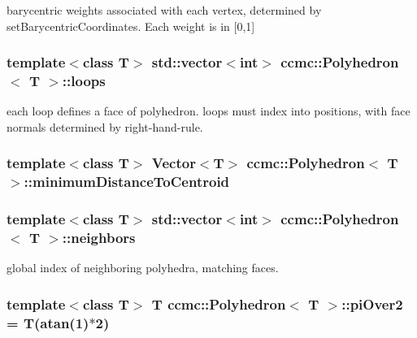 barycentric weights associated with each vertex, determined by set\-Barycentric\-Coordinates. Each weight is in \mbox{[}0,1\mbox{]} \hypertarget{classccmc_1_1_polyhedron_a275e8b1b13a16013da6bd125e203fd2c}{
\subsubsection[{loops}]{\setlength{\rightskip}{0pt plus 5cm}template$<$class T$>$ std\-::vector$<$int$>$ {\bf ccmc\-::\-Polyhedron}$<$ T $>$\-::loops}}\label{classccmc_1_1_polyhedron_a275e8b1b13a16013da6bd125e203fd2c}
each loop defines a face of polyhedron. loops must index into positions, with face normals determined by right-\/hand-\/rule. \hypertarget{classccmc_1_1_polyhedron_afd77b1f8d574323a5b4e1b694890b7dc}{
\subsubsection[{minimum\-Distance\-To\-Centroid}]{\setlength{\rightskip}{0pt plus 5cm}template$<$class T$>$ {\bf Vector}$<$T$>$ {\bf ccmc\-::\-Polyhedron}$<$ T $>$\-::minimum\-Distance\-To\-Centroid}}\label{classccmc_1_1_polyhedron_afd77b1f8d574323a5b4e1b694890b7dc}
\hypertarget{classccmc_1_1_polyhedron_aa5b2b229e4e08b8ff1c03ff78fcb6a3b}{
\subsubsection[{neighbors}]{\setlength{\rightskip}{0pt plus 5cm}template$<$class T$>$ std\-::vector$<$int$>$ {\bf ccmc\-::\-Polyhedron}$<$ T $>$\-::neighbors}}\label{classccmc_1_1_polyhedron_aa5b2b229e4e08b8ff1c03ff78fcb6a3b}
global index of neighboring polyhedra, matching faces. \hypertarget{classccmc_1_1_polyhedron_a30dd6a2116a1aaad90753c8c0309eda6}{
\subsubsection[{pi\-Over2}]{\setlength{\rightskip}{0pt plus 5cm}template$<$class T$>$ T {\bf ccmc\-::\-Polyhedron}$<$ T $>$\-::pi\-Over2 = T(atan(1)$\ast$2)\hspace{0.3cm}{\ttfamily [static]}}}\label{classccmc_1_1_polyhedron_a30dd6a2116a1aaad90753c8c0309eda6}


